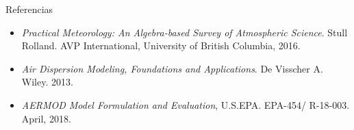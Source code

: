 % 
% 
% 
% 
% 
% 
% 
% 
% 
% 
% 
% 


%
%
%
%
%
%


\begin{frame}{Referencias}

\begin{itemize}
    \item \textit{Practical Meteorology: An Algebra-based Survey of Atmospheric Science}. Stull Rolland. AVP International, University of British Columbia, 2016.
    
    \item \textit{Air Dispersion Modeling, Foundations and Applications}. De Visscher A. Wiley. 2013.
    
    \item \textit{AERMOD Model Formulation and Evaluation}, U.S.EPA. EPA-454/ R-18-003. April, 2018.
\end{itemize}

    
\end{frame}



